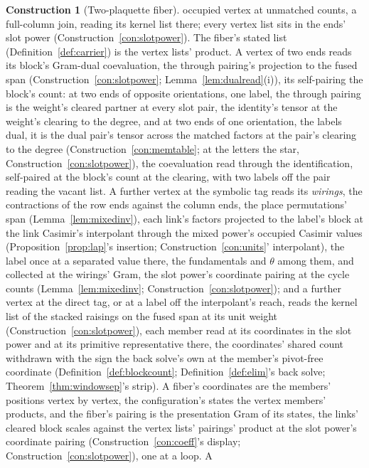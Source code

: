 \documentclass[11pt]{article}
\theoremstyle{definition}
\newtheorem{construction}{Construction}
\begin{document}
\begin{construction}[Two-plaquette fiber]
occupied vertex at unmatched counts, a full-column join, reading
its kernel list there; every vertex list sits in the ends' slot
power (Construction~\ref{con:slotpower}). The fiber's stated list (Definition~\ref{def:carrier}) is
the vertex lists' product. A vertex of two ends reads its block's
Gram-dual coevaluation, the through pairing's projection to the
fused span (Construction~\ref{con:slotpower};
Lemma~\ref{lem:dualread}(i)), its self-pairing the block's count:
at two ends of opposite orientations, one label, the through
pairing is the weight's cleared partner at every slot pair, the
identity's tensor at the weight's clearing to the degree, and at
two ends of one orientation, the labels dual, it is the dual
pair's tensor across the matched factors at the pair's clearing
to the degree (Construction~\ref{con:memtable}; at the letters
the star, Construction~\ref{con:slotpower}), the coevaluation
read through the identification, self-paired at the block's
count at the clearing, with two labels off the pair reading the
vacant list. A further vertex at the symbolic
tag reads its \emph{wirings}, the contractions of the row ends
against the column ends, the place permutations' span
(Lemma~\ref{lem:mixedinv}), each link's factors projected to the
label's block at the link Casimir's interpolant through the mixed
power's occupied Casimir values (Proposition~\ref{prop:lap}'s
insertion; Construction~\ref{con:units}' interpolant), the label
once at a separated value there, the fundamentals and $\theta$
among them, and collected at the wirings' Gram, the slot power's
coordinate pairing at the cycle counts (Lemma~\ref{lem:mixedinv};
Construction~\ref{con:slotpower});
and a further vertex at the direct tag, or at a label off the
interpolant's reach, reads the kernel list of the stacked raisings
on the fused span at its unit weight
(Construction~\ref{con:slotpower}), each member read at its
coordinates in the slot power and at its primitive representative
there, the coordinates' shared count withdrawn with the sign the
back solve's own at the member's pivot-free coordinate
(Definition~\ref{def:blockcount}; Definition~\ref{def:elim}'s back
solve; Theorem~\ref{thm:windowsep}'s strip). A fiber's coordinates are the members'
positions vertex by vertex, the configuration's states the vertex members' products,
and the fiber's pairing is the presentation Gram of its states, the
links' cleared block scales against the vertex lists' pairings'
product at the slot power's coordinate pairing
(Construction~\ref{con:coeff}'s display;
Construction~\ref{con:slotpower}), one at a loop. A

\end{construction}
\end{document}
